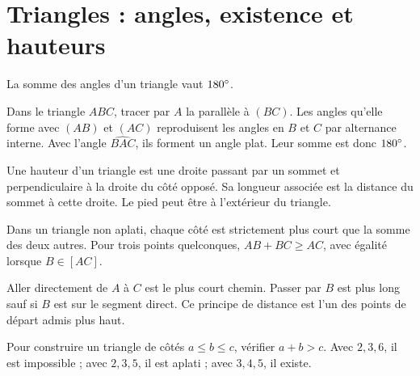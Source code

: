 \documentclass[../cours_3e.tex]{subfiles}
\begin{document}
\section{Triangles : angles, existence et hauteurs}
\begin{theoreme}
La somme des angles d'un triangle vaut $180^{\circ}$.
\end{theoreme}
\begin{demonstration}
Dans le triangle $ABC$, tracer par $A$ la parallèle à $(BC)$. Les angles qu'elle forme avec $(AB)$ et $(AC)$ reproduisent les angles en $B$ et $C$ par alternance interne. Avec l'angle $\widehat{BAC}$, ils forment un angle plat. Leur somme est donc $180^{\circ}$.
\end{demonstration}
\begin{center}
\end{center}
\begin{definition}
Une hauteur d'un triangle est une droite passant par un sommet et perpendiculaire à la droite du côté opposé. Sa longueur associée est la distance du sommet à cette droite. Le pied peut être à l'extérieur du triangle.
\end{definition}
\begin{propriete}
Dans un triangle non aplati, chaque côté est strictement plus court que la somme des deux autres. Pour trois points quelconques, $AB+BC\geq AC$, avec égalité lorsque $B\in[AC]$.
\end{propriete}
\begin{justification}
Aller directement de $A$ à $C$ est le plus court chemin. Passer par $B$ est plus long sauf si $B$ est sur le segment direct. Ce principe de distance est l'un des points de départ admis plus haut.
\end{justification}
Pour construire un triangle de côtés $a\leq b\leq c$, vérifier $a+b>c$. Avec $2,3,6$, il est impossible ; avec $2,3,5$, il est aplati ; avec $3,4,5$, il existe.
\end{document}
